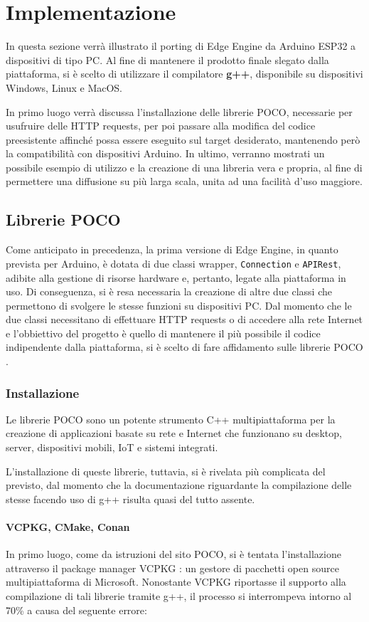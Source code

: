 \chapter{Implementazione}
In questa sezione verrà illustrato il porting di Edge Engine da Arduino ESP32 a dispositivi di tipo PC. Al fine di mantenere il prodotto finale slegato dalla piattaforma, si è scelto di utilizzare il compilatore \textbf{g++}, disponibile su dispositivi Windows, Linux e MacOS.

In primo luogo verrà discussa l’installazione delle librerie POCO, necessarie per usufruire delle HTTP requests, per poi passare alla modifica del codice preesistente affinché possa essere eseguito sul target desiderato, mantenendo però la compatibilità con dispositivi Arduino. In ultimo, verranno mostrati un possibile esempio di utilizzo e la creazione di una libreria vera e propria, al fine di permettere una diffusione su più larga scala, unita ad una facilità d'uso maggiore.
\section{Librerie POCO}
Come anticipato in precedenza, la prima versione di Edge Engine, in quanto prevista per Arduino, è dotata di due classi wrapper, \texttt{Connection} e \texttt{APIRest}, adibite alla gestione di risorse hardware e, pertanto, legate alla piattaforma in uso. Di conseguenza, si è resa necessaria la creazione di altre due classi che permettono di svolgere le stesse funzioni su dispositivi PC. Dal momento che le due classi necessitano di effettuare HTTP requests o di accedere alla rete Internet e l’obbiettivo del progetto è quello di mantenere il più possibile il codice indipendente dalla piattaforma, si è scelto di fare affidamento sulle librerie POCO \cite{POCO}.
\subsection{Installazione}
Le librerie POCO sono un potente strumento C++ multipiattaforma per la creazione di applicazioni basate su rete e Internet che funzionano su desktop, server, dispositivi mobili, IoT e sistemi integrati.

L’installazione di queste librerie, tuttavia, si è rivelata più complicata del previsto, dal momento che la documentazione riguardante la compilazione delle stesse facendo uso di g++ risulta quasi del tutto assente.

\subsubsection{VCPKG, CMake, Conan}
In primo luogo, come da istruzioni del sito POCO, si è tentata l’installazione attraverso il package manager VCPKG \cite{VCPKG}: un gestore di pacchetti open source multipiattaforma di Microsoft. Nonostante VCPKG riportasse il supporto alla compilazione di tali librerie tramite g++, il processo si interrompeva intorno al 70\% a causa del seguente errore:

